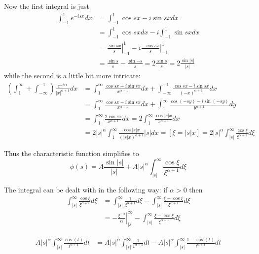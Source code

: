 \documentclass[a4paper]{article}
\newcommand{\clo}[1]{{\left [ #1 \right ]}}
\newcommand{\brac}[1]{{\left ( #1 \right )}}
\newcommand{\induc}[1]{{\left . #1 \right \vert}}
\newcommand{\abs}[1]{{\left | #1 \right |}}
\begin{document}
Now the first integral is just \begin{align*}
	\int_{-1}^1 e^{-isx} dx &= \int_{-1}^1 \cos{sx} - i\sin{sx} dx \\ 
	& = \int_{-1}^1 \cos{sx} dx - i \int_{-1}^1 \sin{sx} dx \\
	& =  \induc{\frac{\sin{sx}}{s}}_{-1}^1 - i \induc{\frac{-\cos{sx}}{s}}_{-1}^1\\
	& = \frac{\sin{s}}{s}-\frac{\sin{-s}}{s} = 2 \frac{\sin{s}}{s} = 2 \frac{\sin\abs{s}}{\abs{s}}
\end{align*}
while the second is a little bit more intricate:
\begin{align*}
	\brac{\int_1^\infty + \int_{-\infty}^{-1}} \frac{e^{-isx} }{\abs{x}^{\alpha+1}} dx
	& = \int_1^\infty \frac{\cos{sx}-i\sin{sx}}{x^{\alpha+1}} dx + \int_{-\infty}^{-1} \frac{\cos{sx}-i\sin{sx}}{\brac{-x}^{\alpha+1}} dx \\
	& = \int_1^\infty \frac{\cos{sx}-i\sin{sx}}{x^{\alpha+1}} dx + \int_1^\infty \frac{\cos(-sy)-i\sin(-sy)}{y^{\alpha+1}} dy \\
	& = \int_1^\infty \frac{2\cos{sx}}{x^{\alpha+1}} dx = 2\int_1^\infty \frac{\cos{\abs{s}x}}{x^{\alpha+1}} dx \\
	& = 2\abs{s}^\alpha \int_1^\infty \frac{\cos{\abs{s}x}}{\brac{\abs{s}x}^{\alpha+1}} \abs{s}dx
	= \clo{\xi = \abs{s}x}
	= 2\abs{s}^\alpha \int_{\abs{s}}^\infty \frac{\cos \xi}{\xi^{\alpha+1}} d\xi
\end{align*}

Thus the characteristic function simplifies to
\[\phi(s) = A \frac{\sin\abs{s}}{\abs{s}} + A \abs{s}^\alpha \int_{\abs{s}}^\infty \frac{\cos \xi}{\xi^{\alpha+1}} d\xi \]

The integral can be dealt with in the following way: if $\alpha>0$ then \begin{align*}
	\int_{\abs{s}}^\infty \frac{\cos \xi}{\xi^{\alpha+1}} d\xi
	& = \int_{\abs{s}}^\infty \frac{1}{\xi^{\alpha+1}} d\xi - \int_{\abs{s}}^\infty \frac{\xi - \cos\xi}{\xi^{\alpha+1}} d\xi\\
	& = \induc{-\frac{\xi^{-\alpha}}{\alpha}}_{\abs{s}}^\infty - \int_{\abs{s}}^\infty \frac{\xi - \cos\xi}{\xi^{\alpha+1}} d\xi
\end{align*}

\begin{align*}
A \abs{s}^\alpha \int_\abs{s}^\infty \frac{\cos(t)}{t^{\alpha+1}}dt
&= A \abs{s}^\alpha \int_\abs{s}^\infty \frac{1}{t^{\alpha+1}} dt - A \abs{s}^\alpha \int_\abs{s}^\infty \frac{1-\cos(t)}{t^{\alpha+1}}dt
\end{align*}
\end{document}

